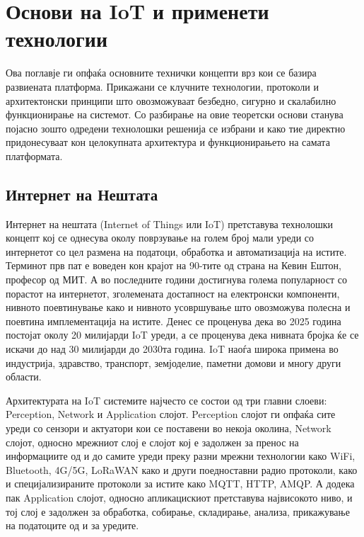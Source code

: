\newpage

\section{Основи на IoT и применети технологии}

Ова поглавје ги опфаќа основните технички концепти врз кои се базира
развиената платформа. Прикажани се клучните технологии, протоколи и
архитектонски принципи што овозможуваат безбедно, сигурно и скалабилно
функционирање на системот. Со разбирање на овие теоретски основи станува
појасно зошто одредени технолошки решенија се избрани и како тие
директно придонесуваат кон целокупната архитектура и функционирањето на
самата платформата.

\subsection{Интернет на Нештата}

Интернет на нештата (Internet of Things или IoT) претставува технолошки
концепт кој се однесува околу поврзување на голем број мали уреди со
интернетот со цел размена на податоци, обработка и автоматизација на
истите. Терминот прв пат е воведен кон крајот на 90-тите од страна на
Кевин Ештон, професор од МИТ. А во последните години достигнува голема
популарност со порастот на интернетот, зголемената достапност на
електронски компоненти, нивното поевтинување како и нивното усовршување
што овозможува полесна и поевтина имплементација на истите. Денес се
проценува дека во 2025 година постојат околу 20 милијарди IoT уреди, а
се проценува дека нивната бројка ќе се искачи до над 30 милијарди до
2030та година. IoT наоѓа широка примена во индустрија, здравство,
транспорт, земјоделие, паметни домови и многу други области.

Архитектурата на IoT системите најчесто се состои од три главни слоеви:
Perception, Network и Application слојот. Perception слојот ги опфаќа
сите уреди со сензори и актуатори кои се поставени во некоја околина,
Network слојот, односно мрежниот слој е слојот кој е задолжен за пренос
на информациите од и до самите уреди преку разни мрежни технологии како
WiFi, Bluetooth, 4G/5G, LoRaWAN како и други поедноставни радио
протоколи, како и специјализираните протоколи за истите како MQTT, HTTP,
AMQP. А додека пак Application слојот, односно апликацискиот претставува
највисокото ниво, и тој слој е задолжен за обработка, собирање,
складирање, анализа, прикажување на податоците од и за уредите.

